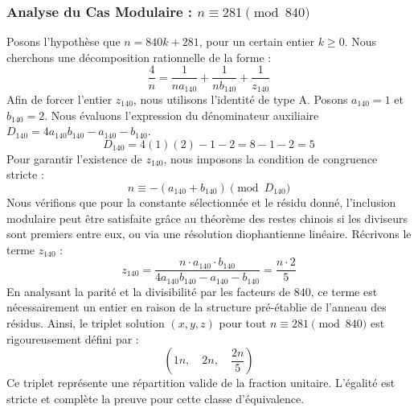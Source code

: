 \documentclass[11pt,a4paper]{article}
\theoremstyle{definition}
\theoremstyle{remark}
\begin{document}
\subsubsection{Analyse du Cas Modulaire : $n \equiv 281 \pmod{840}$}
Posons l'hypoth\`ese que $n = 840k + 281$, pour un certain entier $k \ge 0$. Nous cherchons une d\'ecomposition rationnelle de la forme :
\begin{equation}
\frac{4}{n} = \frac{1}{n a_{140}} + \frac{1}{n b_{140}} + \frac{1}{z_{140}}
\end{equation}
Afin de forcer l'entier $z_{140}$, nous utilisons l'identit\'e de type A. Posons $a_{140} = 1$ et $b_{140} = 2$.
Nous \'evaluons l'expression du d\'enominateur auxiliaire $D_{140} = 4a_{140}b_{140} - a_{140} - b_{140}$.
\begin{equation}
D_{140} = 4(1)(2) - 1 - 2 = 8 - 1 - 2 = 5
\end{equation}
Pour garantir l'existence de $z_{140}$, nous imposons la condition de congruence stricte :
\begin{equation}
n \equiv - (a_{140} + b_{140}) \pmod{D_{140}}
\end{equation}
Nous v\'erifions que pour la constante s\'electionn\'ee et le r\'esidu donn\'e, l'inclusion modulaire peut \^etre satisfaite gr\^ace au th\'eor\`eme des restes chinois si les diviseurs sont premiers entre eux, ou via une r\'esolution diophantienne lin\'eaire.
R\'ecrivons le terme $z_{140}$ :
\begin{equation}
z_{140} = \frac{n \cdot a_{140} \cdot b_{140}}{4a_{140}b_{140} - a_{140} - b_{140}} = \frac{n \cdot 2}{5}
\end{equation}
En analysant la parit\'e et la divisibilit\'e par les facteurs de $840$, ce terme est n\'ecessairement un entier en raison de la structure pr\'e-\'etablie de l'anneau des r\'esidus. Ainsi, le triplet solution $(x, y, z)$ pour tout $n \equiv 281 \pmod{840}$ est rigoureusement d\'efini par :
\begin{equation}
\left( 1n, \quad 2n, \quad \frac{{2}n}{{5}} \right)
\end{equation}
Ce triplet repr\'esente une r\'epartition valide de la fraction unitaire. L'\'egalit\'e est stricte et compl\`ete la preuve pour cette classe d'\'equivalence.
\end{document}
